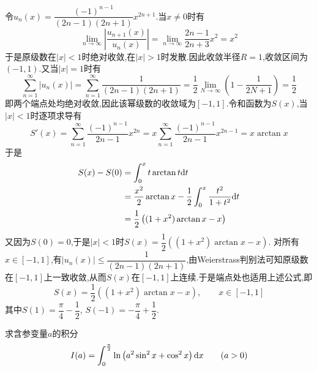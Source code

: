 \documentclass{ctexart}
\begin{document}
\begin{solution}
    令$u_n(x)=\dfrac{(-1)^{n-1}}{(2n-1)(2n+1)}x^{2n+1}$.当$x\neq0$时有
    \[\lim_{n\to\infty}\left|\dfrac{u_{n+1}(x)}{u_n(x)}\right|
    =\lim_{n\to\infty}\dfrac{2n-1}{2n+3}x^2=x^2\]
    于是原级数在$|x|<1$时绝对收敛,在$|x|>1$时发散.因此收敛半径$R=1$,收敛区间为$(-1,1)$.又当$|x|=1$时有
    \[\sum_{n=1}^{\infty}|u_n(x)|
    =\sum_{n=1}^{\infty}\dfrac{1}{(2n-1)(2n+1)}
    =\dfrac12\lim_{N\to\infty}\left(1-\dfrac{1}{2N+1}\right)=\dfrac12\]
    即两个端点处均绝对收敛,因此该幂级数的收敛域为$[-1,1]$.令和函数为$S(x)$,当$|x|<1$时逐项求导有
    \[S'(x)=\sum_{n=1}^{\infty}\dfrac{(-1)^{n-1}}{2n-1}x^{2n}=x\sum_{n=1}^{\infty}\dfrac{(-1)^{n-1}}{2n-1}x^{2n-1}=x\arctan x\]
    于是
    \[\begin{aligned}
        S(x)-S(0)
        &= \int_0^x t\arctan t\mathrm{d} t \\
        &= \dfrac{x^2}{2}\arctan x-\dfrac12\int_0^x\dfrac{t^2}{1+t^2}\mathrm{d} t \\
        &= \dfrac12\left((1+x^2)\arctan x-x\right)
    \end{aligned}\]
    又因为$S(0)=0$,于是$|x|<1$时$S(x)=\dfrac12\left((1+x^2)\arctan x-x\right)$.
    对所有$x\in[-1,1]$,有$|u_n(x)|\leqslant\dfrac{1}{(2n-1)(2n+1)}$,由Weierstrass判别法可知原级数在$[-1,1]$上一致收敛,从而$S(x)$在$[-1,1]$上连续.于是端点处也适用上述公式,即
    \[S(x)=\dfrac12\left((1+x^2)\arctan x-x\right),\qquad x\in[-1,1]\]
    其中$S(1)=\dfrac\pi4-\dfrac12$, $S(-1)=-\dfrac\pi4+\dfrac12$.

\end{solution}
\begin{problem}[4.(12\songti{分})]
    求含参变量$a$的积分
    \[I(a)=\int_0^{\frac\pi2}\ln\left(a^2\sin^2x+\cos^2x\right)\mathrm{d} x\qquad(a>0)\]
        
\end{problem}
\end{document}
